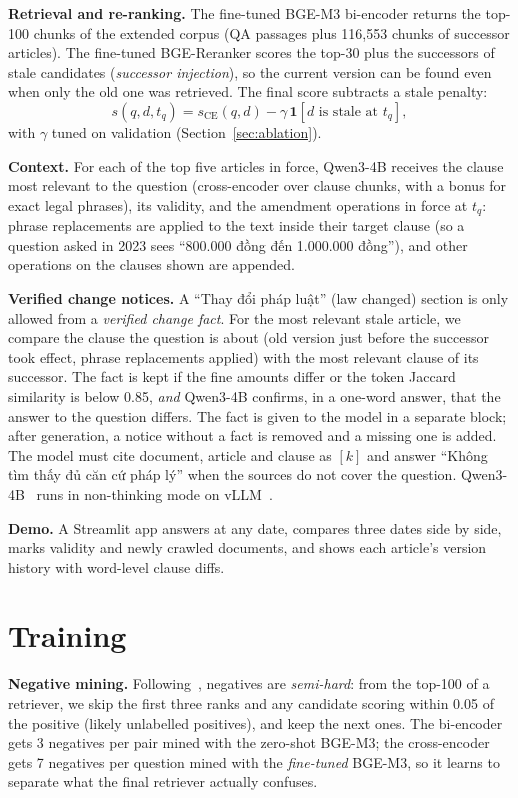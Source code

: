 \documentclass{article} %
\begin{document}
\textbf{Retrieval and re-ranking.} The fine-tuned BGE-M3 bi-encoder returns the top-100 chunks of the extended corpus (QA
passages plus 116,553 chunks of successor articles). The fine-tuned BGE-Reranker scores the top-30 plus the successors
of stale candidates (\emph{successor injection}), so the current version can be found even when only the old one was
retrieved. The final score subtracts a stale penalty:
\[
s(q, d, t_q) = s_{\mathrm{CE}}(q, d) - \gamma \, \mathbf{1}\left[d \text{ is stale at } t_q\right],
\]
with $\gamma$ tuned on validation (Section~\ref{sec:ablation}).

\textbf{Context.} For each of the top five articles in force, Qwen3-4B receives the clause most relevant to the
question (cross-encoder over clause chunks, with a bonus for exact legal phrases), its validity, and the amendment
operations in force at $t_q$: phrase replacements are applied to the text inside their target clause (so a question
asked in 2023 sees ``800.000 đồng đến 1.000.000 đồng''), and other operations on the clauses shown are appended.

\textbf{Verified change notices.} A ``Thay đổi pháp luật'' (law changed) section is only allowed from a \emph{verified change fact}.
For the most relevant stale article, we compare the clause the question is about (old version just before the successor
took effect, phrase replacements applied) with the most relevant clause of its successor. The fact is kept if the fine
amounts differ or the token Jaccard similarity is below 0.85, \emph{and} Qwen3-4B confirms, in a one-word answer, that
the answer to the question differs. The fact is given to the model in a separate block; after generation, a notice
without a fact is removed and a missing one is added. The model must cite document, article and clause as $[k]$ and
answer ``Không tìm thấy đủ căn cứ pháp lý'' when the sources do not cover the question. Qwen3-4B~\citep{qwen3} runs in
non-thinking mode on vLLM~\citep{kwon2023vllm}.

\textbf{Demo.} A Streamlit app answers at any date, compares three dates side by side, marks validity and newly
crawled documents, and shows each article's version history with word-level clause diffs.

\section{Training}
\label{sec:training}
\textbf{Negative mining.} Following~\citet{le2025semihard}, negatives are \emph{semi-hard}: from the top-100 of a
retriever, we skip the first three ranks and any candidate scoring within 0.05 of the positive (likely unlabelled positives),
and keep the next ones. The bi-encoder gets 3 negatives per pair mined with the zero-shot BGE-M3; the cross-encoder gets
7 negatives per question mined with the \emph{fine-tuned} BGE-M3, so it learns to separate what the final retriever
actually confuses.
\end{document}
